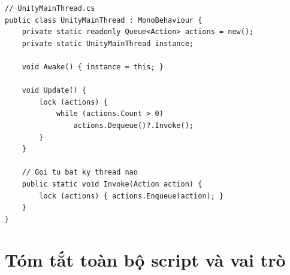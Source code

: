 \documentclass[12pt,a4paper]{report}
\begin{document}
\begin{lstlisting}[style=bashStyle, caption={UnityMainThread --- queue thực thi trên main thread}, label={lst:mainthread}]
// UnityMainThread.cs
public class UnityMainThread : MonoBehaviour {
    private static readonly Queue<Action> actions = new();
    private static UnityMainThread instance;

    void Awake() { instance = this; }

    void Update() {
        lock (actions) {
            while (actions.Count > 0)
                actions.Dequeue()?.Invoke();
        }
    }

    // Goi tu bat ky thread nao
    public static void Invoke(Action action) {
        lock (actions) { actions.Enqueue(action); }
    }
}
\end{lstlisting}

\section{Tóm tắt toàn bộ script và vai trò}
\end{document}
